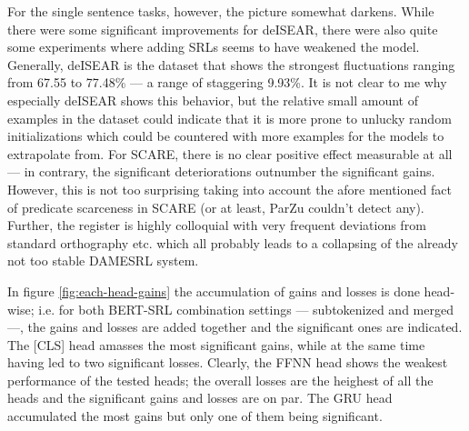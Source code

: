 For the single sentence tasks, however, the picture somewhat darkens. While there were some
significant improvements for deISEAR, there were also quite some experiments where adding SRLs
seems to have weakened the model. Generally, deISEAR is the dataset that shows the strongest
fluctuations ranging from 67.55 to 77.48\% --- a range of staggering 9.93\%. It is not clear
to me why especially deISEAR shows this behavior, but the relative small amount of examples
in the dataset could indicate that it is more prone to unlucky random initializations which
could be countered with more examples for the models to extrapolate from.
For SCARE, there is no clear positive effect measurable at all
--- in contrary, the significant deteriorations outnumber the significant gains. However, this
is not too surprising taking into account the afore mentioned fact of predicate scarceness in
SCARE (or at least, ParZu couldn't detect any). Further, the register is highly colloquial with
very frequent deviations from standard orthography etc. which all probably leads to a collapsing
of the already not too stable DAMESRL system.



In figure \ref{fig:each-head-gains} the accumulation of gains and losses is done head-wise; i.e.
for both BERT-SRL combination settings --- subtokenized and merged ---, the gains and losses
are added together and the significant ones are indicated. The [CLS] head amasses the most
significant gains, while at the same time having led to two significant losses.
Clearly, the FFNN head shows the weakest performance of the tested heads; the overall losses are the heighest
of all the heads and the significant gains and losses are on par. The GRU head accumulated the
most gains but only one of them being significant.


